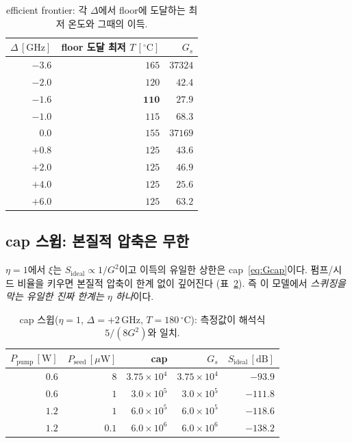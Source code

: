 \documentclass[11pt,a4paper]{article}
\newcommand{\GHz}{\,\mathrm{GHz}}
\newcommand{\degC}{\,^{\circ}\mathrm{C}}
\begin{document}
\begin{table}[h]
\centering
\caption{efficient frontier: 각 $\Delta$에서 floor에 도달하는 최저 온도와 그때의 이득.}
\label{tab:frontier}
\begin{tabular}{rrr}
\toprule
$\Delta\,[\mathrm{GHz}]$ & floor 도달 최저 $T\,[^{\circ}\mathrm{C}]$ & $G_s$\\
\midrule
$-3.6$ & $165$ & $37324$\\
$-2.0$ & $120$ & $42.4$\\
$\mathbf{-1.6}$ & $\mathbf{110}$ & $\mathbf{27.9}$\\
$-1.0$ & $115$ & $68.3$\\
$\phantom{-}0.0$ & $155$ & $37169$\\
$+0.8$ & $125$ & $43.6$\\
$+2.0$ & $125$ & $46.9$\\
$+4.0$ & $125$ & $25.6$\\
$+6.0$ & $125$ & $63.2$\\
\bottomrule
\end{tabular}
\end{table}

\subsection{cap 스윕: 본질적 압축은 무한}
$\eta=1$에서 $\xi$는 $S_{\mathrm{ideal}}\propto 1/G^2$이고 이득의 유일한 상한은
cap~\eqref{eq:Gcap}이다. 펌프/시드 비율을 키우면 본질적 압축이 한계 없이 깊어진다
(표~\ref{tab:cap}). 즉 이 모델에서 \emph{스퀴징을 막는 유일한 진짜 한계는 $\eta$ 하나}이다.

\begin{table}[h]
\centering
\caption{cap 스윕($\eta=1$, $\Delta=+2\GHz$, $T=180\degC$): 측정값이 해석식
$5/(8G^2)$와 일치.}
\label{tab:cap}
\begin{tabular}{rrrrr}
\toprule
$P_{\mathrm{pump}}\,[\mathrm{W}]$ & $P_{\mathrm{seed}}\,[\mu\mathrm{W}]$ & cap & $G_s$ & $S_{\mathrm{ideal}}\,[\mathrm{dB}]$\\
\midrule
$0.6$ & $8$    & $3.75\times10^4$ & $3.75\times10^4$ & $-93.9$\\
$0.6$ & $1$    & $3.0\times10^5$  & $3.0\times10^5$  & $-111.8$\\
$1.2$ & $1$    & $6.0\times10^5$  & $6.0\times10^5$  & $-118.6$\\
$1.2$ & $0.1$  & $6.0\times10^6$  & $6.0\times10^6$  & $-138.2$\\
\bottomrule
\end{tabular}
\end{table}
\end{document}
